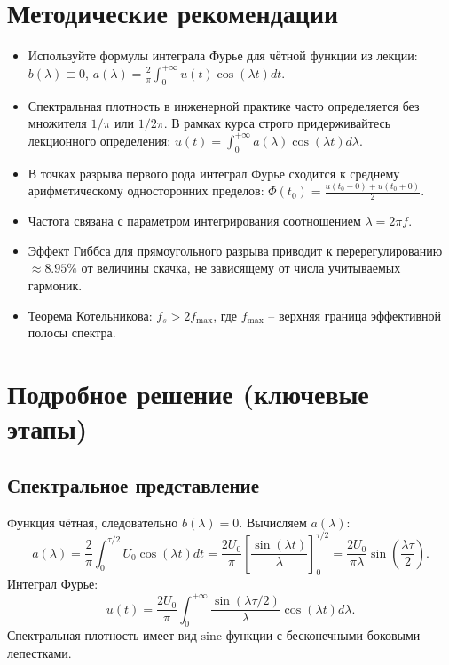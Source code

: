 \documentclass[12pt,a4paper]{article}
\begin{document}
\section{Методические рекомендации}
\begin{itemize}
    \item[$\blacktriangleright$] Используйте формулы интеграла Фурье для чётной функции из лекции: $b(\lambda) \equiv 0$, $a(\lambda) = \frac{2}{\pi} \int_{0}^{+\infty} u(t) \cos(\lambda t) dt$.
    \item[$\blacktriangleright$] Спектральная плотность в инженерной практике часто определяется без множителя $1/\pi$ или $1/2\pi$. В рамках курса строго придерживайтесь лекционного определения: $u(t) = \int_{0}^{+\infty} a(\lambda) \cos(\lambda t) d\lambda$.
    \item[$\blacktriangleright$] В точках разрыва первого рода интеграл Фурье сходится к среднему арифметическому односторонних пределов: $\Phi(t_0) = \frac{u(t_0-0)+u(t_0+0)}{2}$.
    \item[$\blacktriangleright$] Частота связана с параметром интегрирования соотношением $\lambda = 2\pi f$.
    \item[$\blacktriangleright$] Эффект Гиббса для прямоугольного разрыва приводит к перерегулированию $\approx 8.95\%$ от величины скачка, не зависящему от числа учитываемых гармоник.
    \item[$\blacktriangleright$] Теорема Котельникова: $f_s > 2 f_{\max}$, где $f_{\max}$ -- верхняя граница эффективной полосы спектра.
\end{itemize}

\section{Подробное решение (ключевые этапы)}

\subsection{Спектральное представление}
Функция чётная, следовательно $b(\lambda)=0$. Вычисляем $a(\lambda)$:
\[
a(\lambda) = \frac{2}{\pi} \int_{0}^{\tau/2} U_0 \cos(\lambda t) dt = \frac{2U_0}{\pi} \left[ \frac{\sin(\lambda t)}{\lambda} \right]_0^{\tau/2} = \frac{2U_0}{\pi \lambda} \sin\left(\frac{\lambda \tau}{2}\right).
\]
Интеграл Фурье:
\[
u(t) = \frac{2U_0}{\pi} \int_{0}^{+\infty} \frac{\sin(\lambda \tau/2)}{\lambda} \cos(\lambda t) d\lambda.
\]
Спектральная плотность имеет вид $\text{sinc}$-функции с бесконечными боковыми лепестками.
\end{document}
